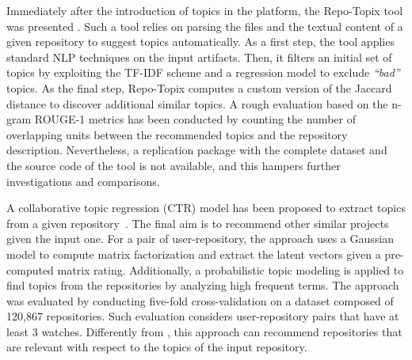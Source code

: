 

Immediately after the introduction of topics in the \GH platform, the 
Repo-Topix tool was presented \cite{ganesan_topic_2017}. Such a tool relies on 
parsing the \RM files and the textual content of a given \GH repository to 
suggest topics automatically. As a first step, the tool applies standard NLP 
techniques on the input artifacts. Then, it filters an initial set of topics 
by exploiting the TF-IDF scheme and a regression model to exclude \emph{``bad''} 
topics. As the final step, Repo-Topix computes a custom version of the Jaccard 
distance to discover additional similar topics. A rough evaluation based on the 
n-gram ROUGE-1 metrics has been conducted by counting the number of overlapping 
units between the recommended topics and the repository description. 
Nevertheless, a replication package with the complete dataset and the source 
code of the tool is not available, and this hampers further investigations and comparisons. 




A collaborative topic regression (CTR) model has been proposed to extract topics from a given \GH repository~\cite{orii2012collaborative}. The final 
aim is to recommend other similar projects given the input one. For a pair of 
user-repository, the approach uses a Gaussian model to compute matrix 
factorization and extract the latent vectors given a pre-computed matrix 
rating. Additionally, a probabilistic topic modeling is applied to find topics 
from the repositories by analyzing high frequent terms. The approach was 
evaluated by conducting five-fold cross-validation on a dataset composed of  
120,867 repositories. Such evaluation considers user-repository pairs that 
have at least 3 watches. Differently from \TF, this approach can recommend \GH 
 repositories that are relevant with respect to the topics of the input 
 repository.

